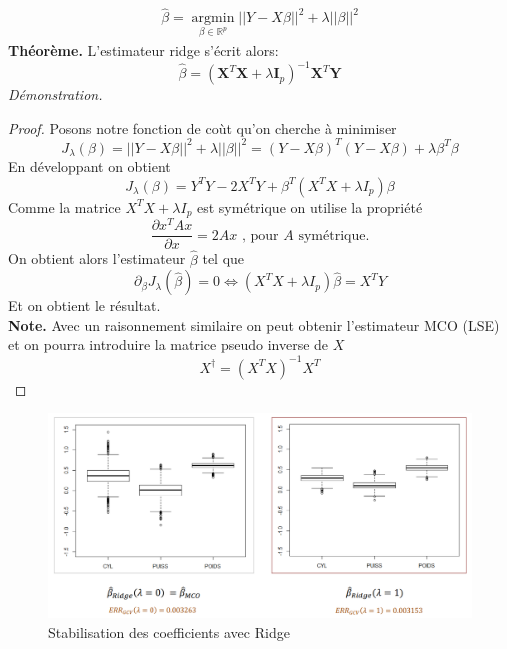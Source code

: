 \documentclass[a4paper]{article}
\newtheorem{proof}{Démonstration}
\begin{document}
\begin{align}
    \hat{\beta} =\underset{{\beta \in \mathbb{R}^p}}{\operatorname{argmin}}  ||Y-X\beta||^2 + \lambda ||\beta||^2 
\end{align}
\textbf{Théorème.} L'estimateur ridge s'écrit alors:
\begin{equation}
    \hat{\beta} = (\textbf{X}^T \textbf{X} +\lambda\textbf{I}_p )^{-1} \textbf{X}^T \textbf{Y}
\end{equation}
\textit{Démonstration.} \begin{proof} Posons notre fonction de coùt qu'on cherche à minimiser
\begin{equation}
    J_{\lambda}(\beta) = ||Y-X\beta||^2 + \lambda ||\beta||^2 = (Y-X\beta)^T(Y-X\beta) + \lambda \beta^T \beta
\end{equation}
En développant on obtient 
\begin{equation*}
    J_{\lambda}(\beta) = Y^T Y - 2X^T Y + \beta^T (X^T X + \lambda I_p) \beta 
\end{equation*}
Comme la matrice $X^T X + \lambda I_p$ est symétrique on utilise la propriété
\begin{equation}
    \frac{\partial x^T A x}{\partial x} = 2 A x \text{  , pour $A$ symétrique.}
\end{equation}
On obtient alors l'estimateur $\hat{\beta}$ tel que
\begin{equation*}
    \partial_{\beta} J_{\lambda} (\hat{\beta}) = 0 \Leftrightarrow (X^T X + \lambda I_p) \hat{\beta} = X^T Y
\end{equation*}
Et on obtient le résultat.\\
\textbf{Note.} Avec un raisonnement similaire on peut obtenir l'estimateur MCO (LSE) et on pourra introduire la matrice pseudo inverse de $X$
\begin{equation}
    X^{\dagger} = (X^T X)^{-1}X^T 
\end{equation}
\end{proof}
\begin{figure}[H]
    \centering
    \includegraphics[scale=0.5]{ridge_perfo.png}
    \caption{Stabilisation des coefficients avec Ridge}
    \label{fig:enter-label}
\end{figure}
\end{document}

